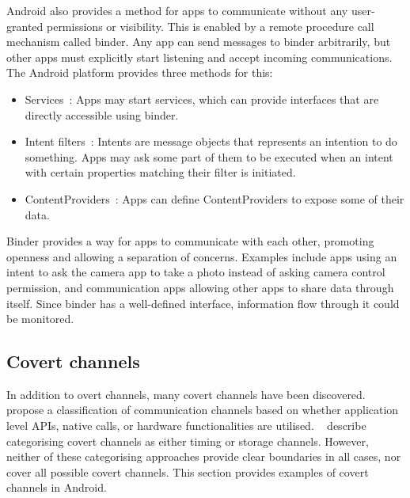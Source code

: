 \documentclass[article]{aaltoseries}
\renewcommand\Gls\cGls
\begin{document}
Android also provides a method for apps to communicate without any user-granted permissions or visibility. This is enabled by a remote procedure call mechanism called binder. Any app can send messages to binder arbitrarily, but other apps must explicitly start listening and accept incoming communications. The Android platform provides three methods for this:
\begin{itemize}
	\item Services~\cite[\href{https://developer.android.com/guide/components/services}{``Services overview''}]{AOSPdeveloper}: Apps may start services, which can provide interfaces that are directly accessible using binder.
	\item Intent filters~\cite[\href{https://developer.android.com/guide/components/intents-filters}{``Intents and Intent Filters''}]{AOSPdeveloper}: Intents are message objects that represents an intention to do something. Apps may ask some part of them to be executed when an intent with certain properties matching their filter is initiated.
	\item ContentProviders~\cite[\href{https://developer.android.com/guide/topics/providers/content-providers}{``Content providers''}]{AOSPdeveloper}: Apps can define ContentProviders to expose some of their data.
\end{itemize}

Binder provides a way for apps to communicate with each other, promoting openness and allowing a separation of concerns. Examples include apps using an intent to ask the camera app to take a photo instead of asking camera control permission, and communication apps allowing other apps to share data through itself. Since binder has a well-defined interface, information flow through it could be monitored.

\subsection{Covert channels}
\label{sec:covert}

In addition to overt channels, many covert channels have been discovered. \citeauthor{Marforio2012}~\cite{Marforio2012} propose a classification of communication channels based on whether application level APIs, \Gls{os} native calls, or hardware functionalities are utilised. \citeauthor{Al-Haiqi2014}~\cite{Al-Haiqi2014} describe categorising covert channels as either timing or storage channels. However, neither of these categorising approaches provide clear boundaries in all cases, nor cover all possible covert channels. This section provides examples of covert channels in Android.
\end{document}
